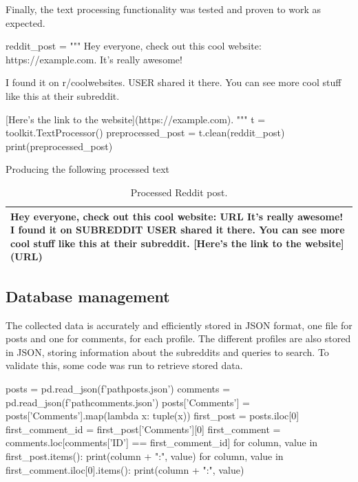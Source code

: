     Finally, the text processing functionality was tested and proven to work as expected.

    \begin{python}
reddit_post = """
Hey everyone, check out this cool website: https://example.com. It's really awesome!

I found it on r/coolwebsites. USER shared it there. You can see more cool stuff like this at their subreddit.

[Here's the link to the website](https://example.com).
"""
t = toolkit.TextProcessor()
preprocessed_post = t.clean(reddit_post)
print(preprocessed_post)
    \end{python}

    Producing the following processed text

    \FloatBarrier
    \begin{table}[ht]
        \centering
        \begin{tabular}{|p{\textwidth}|}
            \hline
            Hey everyone, check out this cool website: URL It's really awesome!  I found it on SUBREDDIT USER shared it there. You can see more cool stuff like this at their subreddit.  [Here's the link to the website](URL) \\
            \hline
        \end{tabular}
        \caption{Processed Reddit post.}
    \end{table}
    \FloatBarrier

    \subsection{Database management}
    The collected data is accurately and efficiently stored in JSON format, one file for posts and one for comments, for each profile. The different profiles are also stored in JSON, storing information about the subreddits and queries to search. To validate this, some code was run to retrieve stored data.

    \begin{python}
posts = pd.read_json(f'{path}posts.json')
comments = pd.read_json(f'{path}comments.json')
posts['Comments'] = posts['Comments'].map(lambda x: tuple(x))
first_post = posts.iloc[0]
first_comment_id = first_post['Comments'][0]
first_comment = comments.loc[comments['ID'] == first_comment_id]
for column, value in first_post.items():
    print(column + ":", value)
for column, value in first_comment.iloc[0].items():
    print(column + ":", value)
    \end{python}

